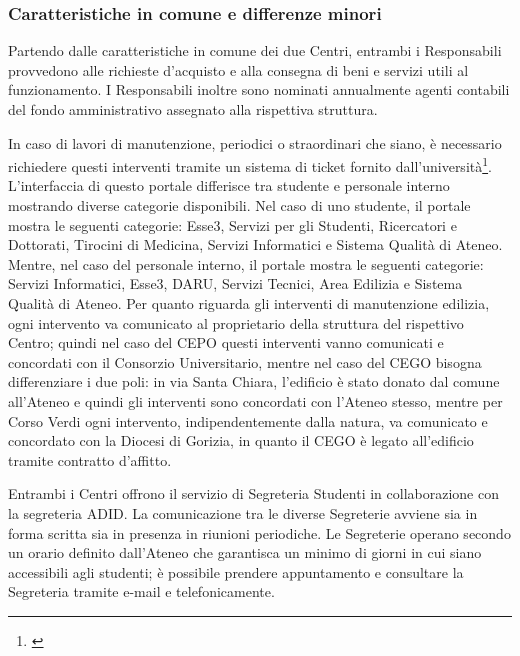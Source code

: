         \subsubsection{Caratteristiche in comune e differenze minori}
            \par
                Partendo dalle caratteristiche in comune dei due Centri, entrambi i Responsabili provvedono alle richieste d'acquisto e alla consegna di beni e servizi utili al funzionamento. I Responsabili inoltre sono nominati annualmente agenti contabili del fondo amministrativo assegnato alla rispettiva struttura. 
            \par
                In caso di lavori di manutenzione, periodici o straordinari che siano, è necessario richiedere questi interventi tramite un sistema di ticket fornito dall'università\footnote{\cite{PortaleSelfServiceSysAid}}. L'interfaccia di questo portale differisce tra studente e personale interno mostrando diverse categorie disponibili. Nel caso di uno studente, il portale mostra le seguenti categorie: Esse3, Servizi per gli Studenti, Ricercatori e Dottorati, Tirocini di Medicina, Servizi Informatici e Sistema Qualità di Ateneo. Mentre, nel caso del personale interno, il portale mostra le seguenti categorie: Servizi Informatici, Esse3, DARU, Servizi Tecnici, Area Edilizia e Sistema Qualità di Ateneo. \newline 
                Per quanto riguarda gli interventi di manutenzione edilizia, ogni intervento va comunicato al proprietario della struttura del rispettivo Centro; quindi nel caso del CEPO questi interventi vanno comunicati e concordati con il Consorzio Universitario, mentre nel caso del CEGO bisogna differenziare i due poli: in via Santa Chiara, l'edificio è stato donato dal comune all'Ateneo e quindi gli interventi sono concordati con l'Ateneo stesso, mentre per Corso Verdi ogni intervento, indipendentemente dalla natura, va comunicato e concordato con la Diocesi di Gorizia, in quanto il CEGO è legato all'edificio tramite contratto d'affitto.
            \par
                Entrambi i Centri offrono il servizio di Segreteria Studenti in collaborazione con la segreteria ADID. La comunicazione tra le diverse Segreterie avviene sia in forma scritta sia in presenza in riunioni periodiche. Le Segreterie operano secondo un orario definito dall'Ateneo che garantisca un minimo di giorni in cui siano accessibili agli studenti; è possibile prendere appuntamento e consultare la Segreteria tramite e-mail e telefonicamente.
            \par
